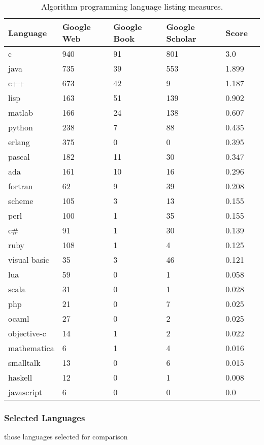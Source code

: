 \documentclass[a4paper, 11pt]{article}
\begin{document}
\begin{table}[ht]
	\centering
		\begin{tabularx}{\textwidth}{llXXXX}
		\toprule
		\textbf{Language} & \textbf{Google Web} & \textbf{Google Book} & \textbf{Google Scholar} & \textbf{Score} \\ 
		\toprule
		c & 940 & 91 & 801 & 3.0 \\
		java & 735 & 39 & 553 & 1.899 \\
		c++ & 673 & 42 & 9 & 1.187 \\
		lisp & 163 & 51 & 139 & 0.902 \\
		matlab & 166 & 24 & 138 & 0.607 \\
		python & 238 & 7 & 88 & 0.435 \\
		erlang & 375 & 0 & 0 & 0.395 \\
		pascal & 182 & 11 & 30 & 0.347 \\
		ada & 161 & 10 & 16 & 0.296 \\
		fortran & 62 & 9 & 39 & 0.208 \\
		scheme & 105 & 3 & 13 & 0.155 \\
		perl & 100 & 1 & 35 & 0.155 \\
		c\# & 91 & 1 & 30 & 0.139 \\
		ruby & 108 & 1 & 4 & 0.125 \\
		visual basic & 35 & 3 & 46 & 0.121 \\
		lua & 59 & 0 & 1 & 0.058 \\
		scala & 31 & 0 & 1 & 0.028 \\
		php & 21 & 0 & 7 & 0.025 \\
		ocaml & 27 & 0 & 2 & 0.025 \\
		objective-c & 14 & 1 & 2 & 0.022 \\
		mathematica & 6 & 1 & 4 & 0.016 \\
		smalltalk & 13 & 0 & 6 & 0.015 \\
		haskell & 12 & 0 & 1 & 0.008 \\
		javascript & 6 & 0 & 0 & 0.0 \\
		\bottomrule
		\end{tabularx}	
	\caption{Algorithm programming language listing measures.}
	\label{tab:results}
\end{table}

\subsubsection{Selected Languages}
\label{subsubsec:selection}
those languages selected for comparison
\end{document}
